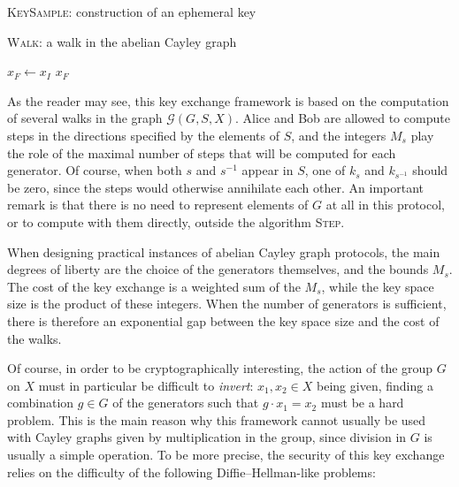 \documentclass{article}
\newcommand{\Graph}{\mathcal{G}}
\newcommand{\algstyle}[1]{\textsc{#1}}
\theoremstyle{definition}
\begin{document}
\begin{algorithm}
	\caption{\algstyle{KeySample}: construction of an ephemeral key}
	\label{alg:key}
\end{algorithm}

\begin{algorithm}
	\caption{\algstyle{Walk}: a walk in the abelian Cayley graph}
	\label{alg:walk}
	$x_F\gets x_I$\;
	\For{$s\in S$}{
		\lFor{\(0 \le i < k_s\)}{
			$x_F\gets$ \algstyle{Step}$(s, x_F)$
		}
	}
	\Return $x_F$
\end{algorithm}

As the reader may see, this key exchange framework is based on the computation
of several walks in the graph $\Graph(G, S, X)$. Alice and Bob are allowed to
compute steps in the directions specified by the elements of $S$, and the integers
$M_s$ play the role of the maximal number of steps that will be computed
for each generator. Of course, when both $s$ and $s^{-1}$ appear in $S$, one
of $k_s$ and $k_{s^{-1}}$ should be zero, since the steps would otherwise
annihilate each other.
An important remark is that there is no need to represent
elements of $G$ at all in this protocol, or to compute with them directly,
outside the algorithm \algstyle{Step}.

When designing practical instances of abelian Cayley graph
protocols, the main degrees of liberty are the choice of the generators themselves,
and the bounds $M_s$. The cost of the key exchange is a weighted
sum of the $M_s$, while the key space size is the product of these integers. When
the number of generators is sufficient, there is therefore an exponential gap
between the key space size and the cost of the walks.

Of course, in order to be
cryptographically interesting, the action of the group $G$ on $X$ must in particular
be difficult to \emph{invert}: $x_1, x_2\in X$ being given, finding a combination
$g\in G$ of the generators such that $g\cdot x_1 = x_2$ must be a hard problem.
This is the main reason why this framework cannot usually be used with
Cayley graphs given by multiplication in the group, since division in $G$ is usually
a simple operation. To be more precise, the security of this key exchange relies
on the difficulty of the following Diffie--Hellman-like problems:
\end{document}
